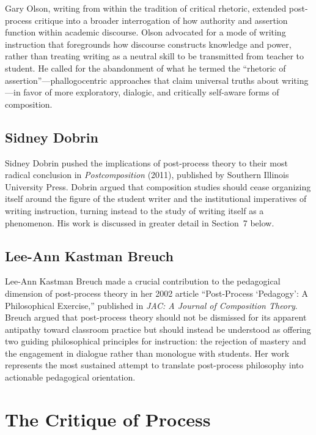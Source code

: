\documentclass[12pt]{article}
\begin{document}
Gary Olson, writing from within the tradition of critical rhetoric, extended post-process critique into a broader interrogation of how authority and assertion function within academic discourse. Olson advocated for a mode of writing instruction that foregrounds how discourse constructs knowledge and power, rather than treating writing as a neutral skill to be transmitted from teacher to student. He called for the abandonment of what he termed the ``rhetoric of assertion''---phallogocentric approaches that claim universal truths about writing---in favor of more exploratory, dialogic, and critically self-aware forms of composition.

\subsection{Sidney Dobrin}

Sidney Dobrin pushed the implications of post-process theory to their most radical conclusion in \textit{Postcomposition} (2011), published by Southern Illinois University Press. Dobrin argued that composition studies should cease organizing itself around the figure of the student writer and the institutional imperatives of writing instruction, turning instead to the study of writing itself as a phenomenon. His work is discussed in greater detail in Section~7 below.

\subsection{Lee-Ann Kastman Breuch}

Lee-Ann Kastman Breuch made a crucial contribution to the pedagogical dimension of post-process theory in her 2002 article ``Post-Process `Pedagogy': A Philosophical Exercise,'' published in \textit{JAC: A Journal of Composition Theory}. Breuch argued that post-process theory should not be dismissed for its apparent antipathy toward classroom practice but should instead be understood as offering two guiding philosophical principles for instruction: the rejection of mastery and the engagement in dialogue rather than monologue with students. Her work represents the most sustained attempt to translate post-process philosophy into actionable pedagogical orientation.

\section{The Critique of Process}
\end{document}
